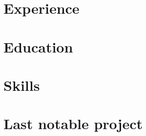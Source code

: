 \section{Experience}





\section{Education}







\clearpage




\section{Skills}
\begin{cvcolumns}
  
  
  
\end{cvcolumns}


\section{Last notable project}




